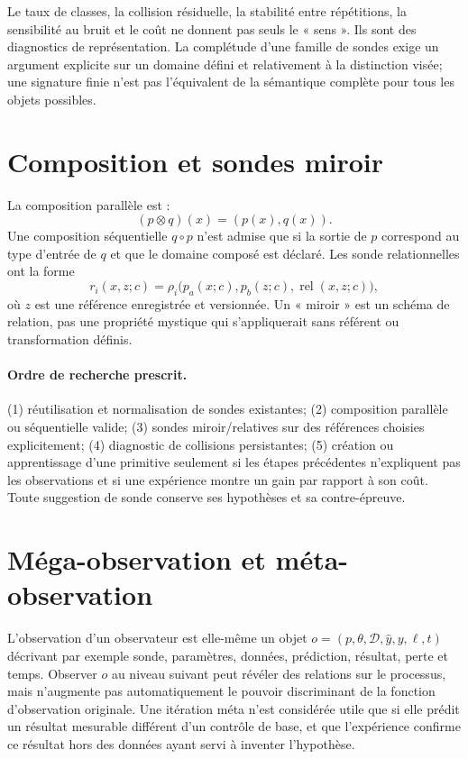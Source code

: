 \documentclass[11pt,a4paper]{report}
\begin{document}
Le taux de classes, la collision résiduelle, la stabilité entre répétitions, la sensibilité au bruit et le coût ne donnent pas seuls le « sens ». Ils sont des diagnostics de représentation. La complétude d'une famille de sondes exige un argument explicite sur un domaine défini et relativement à la distinction visée; une signature finie n'est pas l'équivalent de la sémantique complète pour tous les objets possibles.

\section{Composition et sondes miroir}
La composition parallèle est :
\[
 (p\otimes q)(x)=(p(x),q(x)).
\]
Une composition séquentielle $q\circ p$ n'est admise que si la sortie de $p$ correspond au type d'entrée de $q$ et que le domaine composé est déclaré. Les sonde relationnelles ont la forme
\[
 r_i(x,z;c)=\rho_i\big(p_a(x;c),p_b(z;c),\operatorname{rel}(x,z;c)\big),
\]
où $z$ est une référence enregistrée et versionnée. Un « miroir » est un schéma de relation, pas une propriété mystique qui s'appliquerait sans référent ou transformation définis.

\paragraph{Ordre de recherche prescrit.} (1) réutilisation et normalisation de sondes existantes; (2) composition parallèle ou séquentielle valide; (3) sondes miroir/relatives sur des références choisies explicitement; (4) diagnostic de collisions persistantes; (5) création ou apprentissage d'une primitive seulement si les étapes précédentes n'expliquent pas les observations et si une expérience montre un gain par rapport à son coût. Toute suggestion de sonde conserve ses hypothèses et sa contre-épreuve.

\section{Méga-observation et méta-observation}
L'observation d'un observateur est elle-même un objet $o=(p,\theta,\mathcal{D},\hat{y},y,\ell,t)$ décrivant par exemple sonde, paramètres, données, prédiction, résultat, perte et temps. Observer $o$ au niveau suivant peut révéler des relations sur le processus, mais n'augmente pas automatiquement le pouvoir discriminant de la fonction d'observation originale. Une itération méta n'est considérée utile que si elle prédit un résultat mesurable différent d'un contrôle de base, et que l'expérience confirme ce résultat hors des données ayant servi à inventer l'hypothèse.
\end{document}
